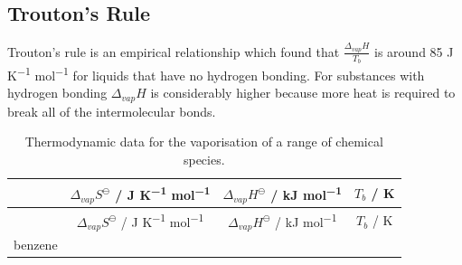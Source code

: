 \documentclass[
]{book}
\begin{document}
\hypertarget{troutons-rule}{%
\subsection{Trouton's Rule}\label{troutons-rule}}

Trouton's rule is an empirical relationship which found that \(\frac{\Delta_{vap} H }{T_b}\) is around 85 J K\textsuperscript{−1} mol\textsuperscript{−1} for liquids that have no hydrogen bonding. For substances with hydrogen bonding \(\Delta_{vap} H\) is considerably higher because more heat is required to break all of the intermolecular bonds.

\begin{longtable}[]{@{}cccc@{}}
\caption{\label{tab:trouton} Thermodynamic data for the vaporisation of a range of chemical species.}\tabularnewline
\toprule
\begin{minipage}[b]{0.22\columnwidth}\centering
\strut
\end{minipage} & \begin{minipage}[b]{0.22\columnwidth}\centering
\(\Delta_{vap} S^\ominus\) / J K\textsuperscript{−1} mol\textsuperscript{−1}\strut
\end{minipage} & \begin{minipage}[b]{0.22\columnwidth}\centering
\(\Delta_{vap} H^\ominus\) / kJ mol\textsuperscript{−1}\strut
\end{minipage} & \begin{minipage}[b]{0.22\columnwidth}\centering
\(T_b\) / K\strut
\end{minipage}\tabularnewline
\midrule
\endfirsthead
\toprule
\begin{minipage}[b]{0.22\columnwidth}\centering
\strut
\end{minipage} & \begin{minipage}[b]{0.22\columnwidth}\centering
\(\Delta_{vap} S^\ominus\) / J K\textsuperscript{−1} mol\textsuperscript{−1}\strut
\end{minipage} & \begin{minipage}[b]{0.22\columnwidth}\centering
\(\Delta_{vap} H^\ominus\) / kJ mol\textsuperscript{−1}\strut
\end{minipage} & \begin{minipage}[b]{0.22\columnwidth}\centering
\(T_b\) / K\strut
\end{minipage}\tabularnewline
\midrule
\endhead
\begin{minipage}[t]{0.22\columnwidth}\centering
benzene\strut
\end{minipage} & \begin{minipage}[t]{0.22\columnwidth}\centering

\end{minipage}
\end{longtable}
\end{document}

